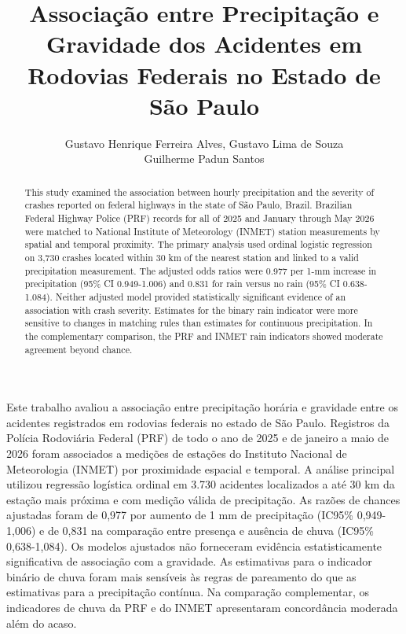 \documentclass[12pt]{article}
\title{Associação entre Precipitação e Gravidade dos Acidentes em Rodovias Federais no Estado de São Paulo}
\author{Gustavo Henrique Ferreira Alves\inst{1}, Gustavo Lima de Souza\inst{1}\\
        Guilherme Padun Santos\inst{1}}
\begin{document}
\maketitle

\begin{abstract}
This study examined the association between hourly precipitation and the
severity of crashes reported on federal highways in the state of São Paulo,
Brazil. Brazilian Federal Highway Police (PRF) records for all of 2025 and
January through May 2026 were matched to National Institute of Meteorology
(INMET) station measurements by spatial and temporal proximity. The primary
analysis used ordinal logistic regression on 3,730 crashes located within
30 km of the nearest station and linked to a valid precipitation measurement.
The adjusted odds ratios were 0.977 per 1-mm increase in precipitation
(95\% CI 0.949-1.006) and 0.831 for rain versus no rain
(95\% CI 0.638-1.084). Neither adjusted model provided statistically
significant evidence of an association with crash severity. Estimates for
the binary rain indicator were more sensitive to changes in matching rules
than estimates for continuous precipitation. In the complementary
comparison, the PRF and INMET rain indicators showed moderate agreement
beyond chance.
\end{abstract}

\begin{resumo}
Este trabalho avaliou a associação entre precipitação horária e gravidade
entre os acidentes registrados em rodovias federais no estado de São Paulo.
Registros da Polícia Rodoviária Federal (PRF) de todo o ano de 2025 e de
janeiro a maio de 2026 foram associados a medições de estações do Instituto
Nacional de Meteorologia (INMET) por proximidade espacial e temporal.
A análise principal utilizou regressão logística ordinal em 3.730 acidentes
localizados a até 30 km da estação mais próxima e com medição válida de
precipitação. As razões de chances ajustadas foram de 0,977 por aumento de
1 mm de precipitação (IC95\% 0,949-1,006) e de 0,831 na comparação entre
presença e ausência de chuva (IC95\% 0,638-1,084). Os modelos ajustados
não forneceram evidência estatisticamente significativa de associação com
a gravidade. As estimativas para o indicador binário de chuva foram mais
sensíveis às regras de pareamento do que as estimativas para a precipitação
contínua. Na comparação complementar, os indicadores de chuva da PRF e do
INMET apresentaram concordância moderada além do acaso.
\end{resumo}
\end{document}
